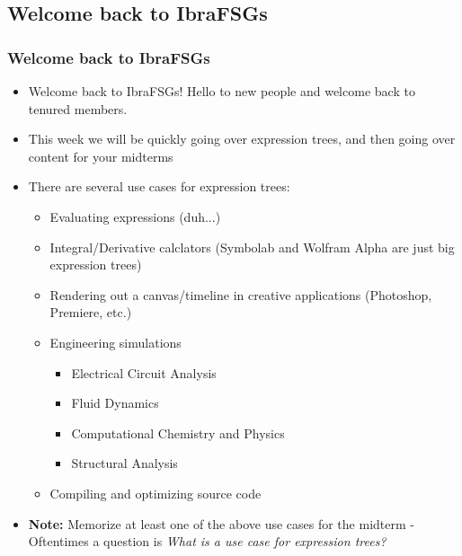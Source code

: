 \documentclass[hyperref={colorlinks,citecolor=blue,linkcolor=blue,urlcolor=blue}, aspectratio=1610]{beamer}
\begin{document}
\subsection{Welcome back to IbraFSGs\texttrademark{}}
\begin{frame}
  \frametitle{Welcome back to IbraFSGs\texttrademark{}}
  \begin{itemize}
  \item Welcome back to IbraFSGs\texttrademark{}! Hello to new people and welcome back to tenured members.
  \item This week we will be quickly going over expression trees, and then going over content for your midterms
  \item There are several use cases for expression trees:
  \begin{itemize}
    \item Evaluating expressions (duh...)
    \item Integral/Derivative calclators (Symbolab and Wolfram Alpha are just big expression trees)
    \item Rendering out a canvas/timeline in creative applications (Photoshop, Premiere, etc.)
    \item Engineering simulations
    \begin{itemize}
      \item Electrical Circuit Analysis
      \item Fluid Dynamics
      \item Computational Chemistry and Physics
      \item Structural Analysis
    \end{itemize}
    \item Compiling and optimizing source code
  \end{itemize}
  \pause
  \item \textbf{Note:} Memorize at least one of the above use cases for the midterm - Oftentimes a question is \textit{What is a use case for expression trees?}

\end{itemize}
\end{frame}
\end{document}
